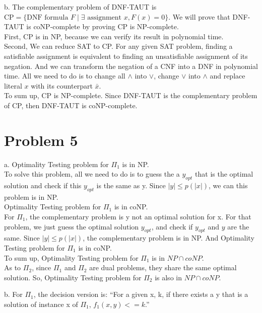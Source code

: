 \documentclass[12pt]{article}
\begin{document}
b. The complementary problem of DNF-TAUT is $\text {CP} = \{ \text{DNF
  formula } F \; | \; \exists \text { assignment } x, F(x) = 0 \}$. We
will prove that DNF-TAUT is coNP-complete by proving CP is
NP-complete. \\

First, CP is in NP, because we can verify its result in polynomial
time. \\

Second, We can reduce SAT to CP. For any given SAT problem, finding a
satisfiable assignment is equivalent to finding an unsatisfiable
assignment of its negation. And we can transform the negation of a CNF
into a DNF in polynomial time. All we need to do is to change all
$\land$ into $\lor$, change $\lor$ into $\land$ and replace literal
$x$ with its counterpart $\bar {x}$. \\

To sum up, CP is NP-complete. Since DNF-TAUT is the complementary
problem of CP, then DNF-TAUT is coNP-complete.

\section*{Problem 5}

a. Optimality Testing problem for $\Pi_1$ is in NP. \\

To solve this problem, all we need to do is to guess the a $y_{opt}$
that is the optimal solution and check if this $y_{opt}$ is the same
as y. Since $|y| \le p(|x|)$, we can this problem is in NP. \\

Optimality Testing problem for $\Pi_1$ is in coNP. \\

For $\Pi_1$, the complementary problem is y not an optimal solution for
x. For that problem, we just guess the optimal solution $y_{opt}$, and check
if $y_{opt}$ and $y$ are the same.  Since $|y| \le p(|x|)$, the
complementary problem is in NP. And Optimality Testing problem for
$\Pi_1$ is in coNP. \\

To sum up, Optimality Testing problem for $\Pi_1$ is in $NP \cap
coNP$. \\

As to $\Pi_2$, since $\Pi_1$ and $\Pi_2$ are dual problems, they share
the same optimal solution. So, Optimality Testing problem for $\Pi_2$
is also in $NP \cap coNP$.

b. For $\Pi_1$, the decision version is: ``For a given x, k, if there
exists a y that is a solution of instance x of $\Pi_1$,  $f_1(x,y) <=
k$.'' \\
\end{document}
